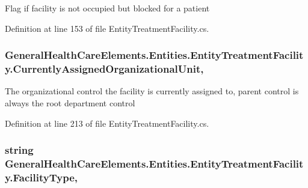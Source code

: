 Flag if facility is not occupied but blocked for a patient 



Definition at line 153 of file Entity\+Treatment\+Facility.\+cs.

\subsubsection[{\texorpdfstring{Currently\+Assigned\+Organizational\+Unit}{CurrentlyAssignedOrganizationalUnit}}]{ General\+Health\+Care\+Elements.\+Entities.\+Entity\+Treatment\+Facility.\+Currently\+Assigned\+Organizational\+Unit\hspace{0.3cm}{\ttfamily [get]}, {\ttfamily [set]}}\hypertarget{class_general_health_care_elements_1_1_entities_1_1_entity_treatment_facility_ac63374b45ac31fc654b19eaa76d2c66a}{}\label{class_general_health_care_elements_1_1_entities_1_1_entity_treatment_facility_ac63374b45ac31fc654b19eaa76d2c66a}


The organizational control the facility is currently assigned to, parent control is always the root department control 



Definition at line 213 of file Entity\+Treatment\+Facility.\+cs.

\subsubsection[{\texorpdfstring{Facility\+Type}{FacilityType}}]{\setlength{\rightskip}{0pt plus 5cm}string General\+Health\+Care\+Elements.\+Entities.\+Entity\+Treatment\+Facility.\+Facility\+Type\hspace{0.3cm}{\ttfamily [get]}, {\ttfamily [set]}}\hypertarget{class_general_health_care_elements_1_1_entities_1_1_entity_treatment_facility_a67893fdf23350cb371a58f8e4ec9162a}{}\label{class_general_health_care_elements_1_1_entities_1_1_entity_treatment_facility_a67893fdf23350cb371a58f8e4ec9162a}


